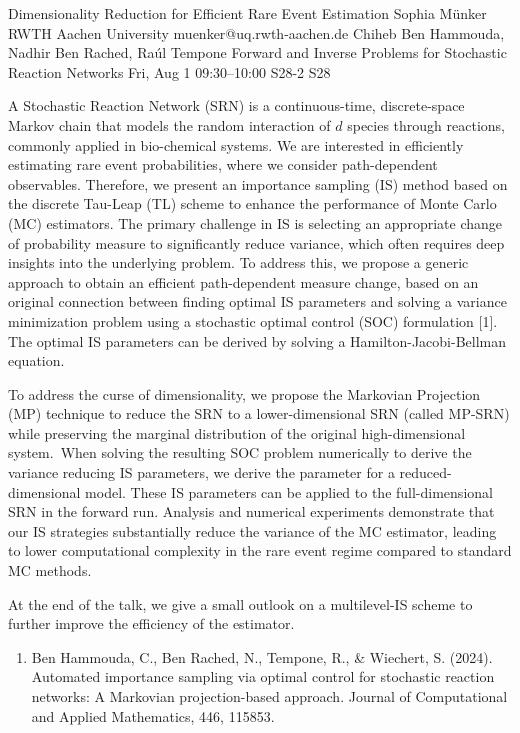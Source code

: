 \begin{talk}
  {Dimensionality Reduction for Efficient Rare Event Estimation}%
  {Sophia M\"unker}%
  {RWTH Aachen University}%
  {muenker@uq.rwth-aachen.de}%
  {Chiheb Ben Hammouda, Nadhir Ben Rached, Ra\'ul Tempone}%
  {Forward and Inverse Problems for Stochastic Reaction Networks}%
  {Fri, Aug 1 09:30--10:00}%
  {S28-2}%
  {S28}%
    
   
A Stochastic Reaction Network (SRN) is a continuous-time, discrete-space Markov chain that models the random interaction of $d$ species through reactions, commonly applied in bio-chemical systems. We are interested in efficiently estimating rare event probabilities, where we consider path-dependent observables. Therefore, we present an importance sampling (IS) method based on the discrete Tau-Leap (TL) scheme to enhance the performance of Monte Carlo (MC) estimators. The primary challenge in IS is selecting an appropriate change of probability measure to significantly reduce variance, which often requires deep insights into the underlying problem. To address this, we propose a generic approach to obtain an efficient path-dependent measure change, based on an original connection between finding optimal IS parameters and solving a variance minimization problem using a stochastic optimal control (SOC) formulation [1]. The optimal IS parameters can be derived by solving a Hamilton-Jacobi-Bellman equation.

To address the curse of dimensionality, we propose the Markovian Projection (MP) technique to reduce the SRN to a lower-dimensional SRN (called MP-SRN) while preserving the marginal distribution of the original high-dimensional system. When solving the resulting SOC problem numerically to derive the variance reducing IS parameters, we derive the parameter for a reduced-dimensional model. These IS parameters can be applied to the full-dimensional SRN in the forward run. Analysis and numerical experiments demonstrate that our IS strategies substantially reduce the variance of the MC estimator, leading to lower computational complexity in the rare event regime compared to standard MC methods. 

At the end of the talk, we give a small outlook on a multilevel-IS scheme to further improve the efficiency of the estimator.


\begin{enumerate}
   \item[{[1]}] Ben Hammouda, C., Ben Rached, N., Tempone, R., \& Wiechert, S. (2024). Automated importance sampling via optimal control for stochastic reaction networks: A Markovian projection-based approach. Journal of Computational and Applied Mathematics, 446, 115853.
\end{enumerate}

\medskip
\end{talk}

